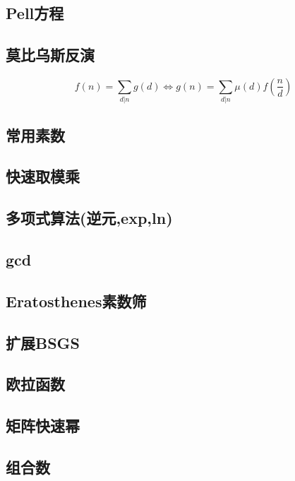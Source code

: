 \documentclass{ctexart}
\begin{document}
\subsection{Pell方程}

\subsection{莫比乌斯反演}
$$ f(n)=\sum_{d|n}g(d) \Longleftrightarrow g(n)=\sum_{d|n}\mu(d)f(\frac{n}{d}) $$
\subsection{常用素数}

\subsection{快速取模乘}

\subsection{多项式算法(逆元,exp,ln)}


\subsection{gcd}

\subsection{Eratosthenes素数筛}

\subsection{扩展BSGS}

\subsection{欧拉函数}

\subsection{矩阵快速幂}

\subsection{组合数}

\end{document}
